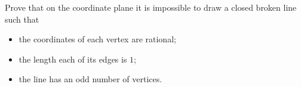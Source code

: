 Prove that on the coordinate plane it is impossible to draw a closed broken line such that
\begin{itemize}
\item[(i)] the coordinates of each vertex are rational;
\item[(ii)] the length each of its edges is $1$;
\item[(iii)] the line has an odd number of vertices.
\end{itemize}
